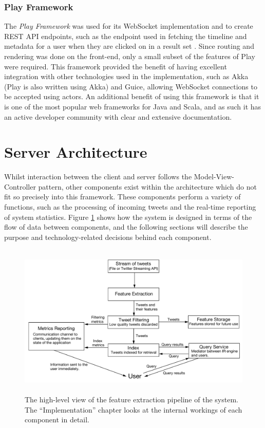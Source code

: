 \documentclass{l4proj}
\begin{document}
        \subsubsection{Play Framework}
        The \textit{Play Framework} was used for its WebSocket implementation and to create REST API endpoints, such as the endpoint used in fetching the timeline and metadata for a user when they are clicked on in a result set \cite{play}. Since routing and rendering was done on the front-end, only a small subset of the features of Play were required. This framework provided the benefit of having excellent integration with other technologies used in the implementation, such as Akka (Play is also written using Akka) and Guice, allowing WebSocket connections to be accepted using actors. An additional benefit of using this framework is that it is one of the most popular web frameworks for Java and Scala, and as such it has an active developer community with clear and extensive documentation.
    
    \section{Server Architecture}
    Whilst interaction between the client and server follows the Model-View-Controller pattern, other components exist within the architecture which do not fit so precisely into this framework. These components perform a variety of functions, such as the processing of incoming tweets and the real-time reporting of system statistics. Figure \ref{architecture} shows how the system is designed in terms of the flow of data between components, and the following sections will describe the purpose and technology-related decisions behind each component.
    
\begin{figure}[H]
\centering
\includegraphics[height=278px,width=496px]{architecture.pdf}
\caption{The high-level view of the feature extraction pipeline of the system. The ``Implementation'' chapter looks at the internal workings of each component in detail.}
\label{architecture}
\end{figure}
    
\end{document}
